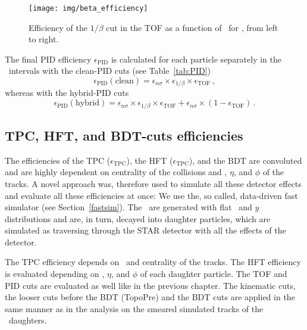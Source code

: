 \begin{figure}[!htb]
\centering
\texttt{[image: img/beta\_efficiency]}
\caption[Efficiency of the $1/\beta$ cut in the TOF as a function of \pt.]{\label{PID_beta} Efficiency of the $1/\beta$ cut in the TOF as a function of \pt\ for \piKandp, from left to right.}
\end{figure}

The final PID efficiency $\epsilon_\text{PID}$ is calculated for each particle separately in the \pt\ intervals with the clean-PID cuts (see Table~\ref{tab:PID})
\begin{equation}
 \epsilon_\text{PID} (\text{clean}) = \epsilon_{n\sigma} \times \epsilon_{1/\beta} \times \epsilon_\mathrm{TOF}\,,
\end{equation}
whereas with the hybrid-PID cuts
\begin{equation}
 \epsilon_\text{PID} (\text{hybrid}) = \epsilon_{n\sigma} \times \epsilon_{1/\beta} \times \epsilon_\mathrm{TOF} + \epsilon_{n\sigma} \times (1-\epsilon_\mathrm{TOF})\,.
\end{equation}

\subsection{TPC, HFT, and BDT-cuts efficiencies}





The efficiencies of the TPC ($\epsilon_\mathrm{TPC}$), the HFT ($\epsilon_\mathrm{TPC}$), and the BDT are convoluted and are highly dependent on centrality of the collisions and \pt, $\eta$, and $\phi$ of the tracks. A novel approach was, therefore used to simulate all these detector effects and evaluate all these efficiencies at once: We use the, so called, data-driven fast simulator (see Section~\ref{fastsim})\@. The \Lambdac\ are generated with flat \pt\ and $y$ distributions and are, in turn, decayed into daughter particles, which are simulated as traversing through the STAR detector with all the effects of the detector. 


The TPC efficiency depends on \pt\ and centrality of the tracks. The HFT efficiency is evaluated depending on \pt, $\eta$, and $\phi$ of each daughter particle. The TOF and PID cuts are evaluated as well like in the previous chapter. The kinematic cuts, the looser cuts before the BDT (TopoPre) and the BDT cuts are applied in the same manner as in the analysis on the smeared simulated tracks of the \Lambdac\ daughters.


